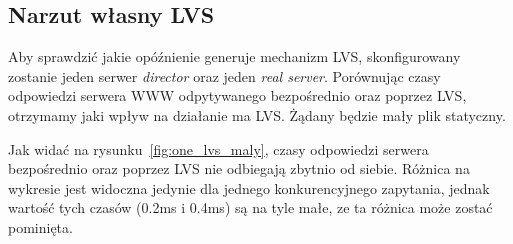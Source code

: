 \subsection{Narzut własny LVS}
Aby sprawdzić jakie opóźnienie generuje mechanizm LVS, skonfigurowany zostanie jeden serwer \textit{director} oraz jeden \textit{real server}.
Porównując czasy odpowiedzi serwera WWW odpytywanego bezpośrednio oraz poprzez LVS, otrzymamy jaki wpływ na działanie ma LVS\@.
Żądany będzie mały plik statyczny.

Jak widać na rysunku~\ref{fig:one_lvs_maly}, czasy odpowiedzi serwera bezpośrednio oraz poprzez LVS nie odbiegają zbytnio od siebie.
Różnica na wykresie jest widoczna jedynie dla jednego konkurencyjnego zapytania, jednak wartość tych czasów (0.2ms i 0.4ms) są na tyle małe, ze ta różnica może zostać pominięta.
